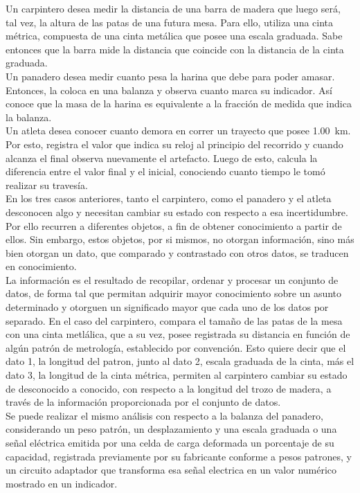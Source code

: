 Un carpintero desea medir la distancia de una barra de madera que luego será, tal vez, la altura de las patas de una futura mesa. Para ello, utiliza una cinta métrica, compuesta de una cinta metálica que posee una escala graduada. Sabe entonces que la barra mide la distancia que coincide con la distancia de la cinta graduada.\\

Un panadero desea medir cuanto pesa la harina que debe para poder amasar. Entonces, la coloca en una balanza y observa cuanto marca su indicador. Así conoce que la masa de la harina es equivalente a la fracción de medida que indica la balanza.\\

Un atleta desea conocer cuanto demora en correr un trayecto que posee \SI{1.00}{\kilo\meter}. Por esto, registra el valor que indica su reloj al principio del recorrido y cuando alcanza el final observa nuevamente el artefacto. Luego de esto, calcula la diferencia entre el valor final y el inicial, conociendo cuanto tiempo le tomó realizar su travesía.\\

En los tres casos anteriores, tanto el carpintero, como el panadero y el atleta desconocen algo y necesitan cambiar su estado con respecto a esa incertidumbre. Por ello recurren a diferentes objetos, a fin de obtener conocimiento a partir de ellos. Sin embargo, estos objetos, por si mismos, no otorgan información, sino más bien otorgan un dato, que comparado y contrastado con otros datos, se traducen en conocimiento.\\

La información es el resultado de recopilar, ordenar y procesar un conjunto de datos, de forma tal que permitan adquirir mayor conocimiento sobre un asunto determinado y otorguen un significado mayor que cada uno de los datos por separado. En el caso del carpintero, compara el tamaño de las patas de la mesa con una cinta metlálica, que a su vez, posee registrada su distancia en función de algún patrón de metrología, establecido por convención. Esto quiere decir que el dato 1, la longitud del patron, junto al dato 2, escala graduada de la cinta, más el dato 3, la longitud de la cinta métrica, permiten al carpintero cambiar su estado de desconocido a conocido, con respecto a la longitud del trozo de madera, a través de la información proporcionada por el conjunto de datos.\\

Se puede realizar el mismo análisis con respecto a la balanza del panadero, considerando un peso patrón, un desplazamiento y una escala graduada o una señal eléctrica emitida por una celda de carga deformada un porcentaje de su capacidad, registrada previamente por su fabricante conforme a pesos patrones, y un circuito adaptador que transforma esa señal electrica en un valor numérico mostrado en un indicador.\\


